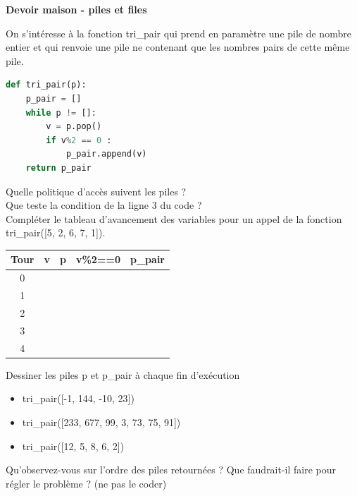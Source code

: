 \begin{center}
    \Large{\textbf{Devoir maison - piles et files} }
\end{center}
On s'intéresse à la fonction tri\_pair qui prend en paramètre une pile de nombre entier et qui renvoie une pile ne contenant que les nombres pairs de cette même pile.

\begin{lstlisting}[language=Python]
def tri_pair(p):
    p_pair = []
    while p != []:
        v = p.pop()
        if v%2 == 0 :
            p_pair.append(v)
    return p_pair
\end{lstlisting}

\begin{Exercise}[title={Pile de nombres pairs}]

\Question Quelle politique d'accès suivent les piles ?\\

\Question Que teste la condition de la ligne 3 du code ?\\

\Question Compléter le tableau d'avancement des variables pour un appel de la fonction tri\_pair([5, 2, 6, 7, 1]).\\

\begin{center}
\large
\begin{tabular}{c|c|c|c|c|}
\textbf{Tour} & v & p & v\%2==0  & p\_pair  \\
\hline
0 &  &  &  & \\
1 &  &  &  & \\
2 &  &  &  & \\
3 &  &  &  & \\
4 &  &  &  & \\
\end{tabular}
\end{center}

\Question Dessiner les piles p et p\_pair à chaque fin d'exécution 
\begin{itemize}
    \item tri\_pair([-1, 144, -10, 23])
    \item tri\_pair([233, 677, 99, 3, 73, 75, 91])
    \item tri\_pair([12, 5, 8, 6, 2])
\end{itemize}

\Question Qu'observez-vous sur l'ordre des piles retournées ? Que faudrait-il faire pour régler le problème ? (ne pas le coder)\\



\end{Exercise}
